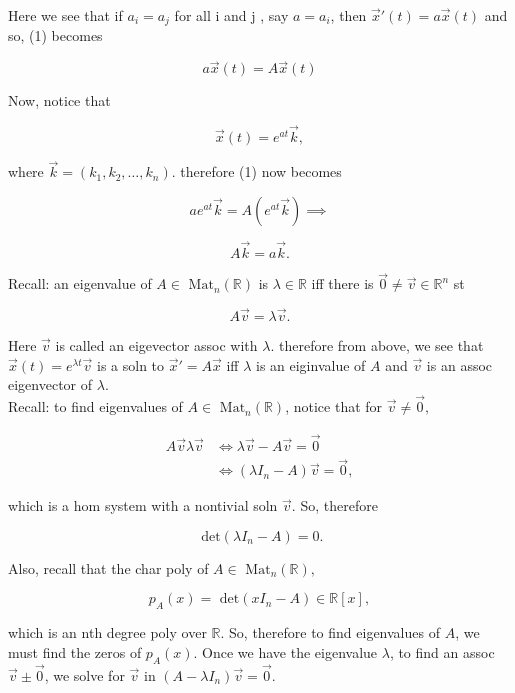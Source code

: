 \documentclass[12pt,a4paper]{article}
\theoremstyle{definition}
\begin{document}
Here we see that if \( a_i = a_j \) for all i and j , say \( a = a_i\), then
\( \vec{x}'(t) = a\vec{x}(t) \) and so, (1) becomes 

\[ a\vec{x}(t) = A\vec{x}(t) \]

Now, notice that 

\[ \vec{x}(t) = e^{at}\vec{k}, \]

where \( \vec{k} = (k_1, k_2, \dots , k_n) \). therefore (1) now becomes

\[ ae^{at}\vec{k} = A(e^{at}\vec{k}) \implies  \]

\[ A\vec{k} = a\vec{k}. \]

Recall: an eigenvalue of \( A \in \text{ Mat}_n( \mathbb{R}) \) is
\( \lambda \in \mathbb{R} \) iff there is \( \vec{0} \neq \vec{v} \in
\mathbb{R}^n\) st 

\[ A\vec{v} = \lambda \vec{v}. \]

Here \( \vec{v} \) is called an eigevector assoc with \( \lambda. \)
therefore from above, we see that \( \vec{x}(t) = e^{\lambda t}\vec{v}
\) is a soln to \( \vec{x}' = A \vec{x} \) iff \( \lambda \) is an
eiginvalue of \( A \) and \( \vec{v} \) is an assoc eigenvector of \(
\lambda. \) \\

Recall: to find eigenvalues of \( A \in \text{ Mat}_n( \mathbb{R}) \),
notice that for \( \vec{v} \neq \vec{0}, \)

\begin{align*}
  A\vec{v} \lambda \vec{v} &\iff \lambda \vec{v} - A \vec{v} = \vec{0}\\
  &\iff (\lambda I_n  - A) \vec{v} = \vec{0}, 
\end{align*}

which is a hom system with a nontivial soln \( \vec{v} \). So, therefore

\[ \text{ det}(\lambda I_n -A) = 0.\]

Also, recall that the char poly of \(  A \in \text{ Mat}_n( \mathbb{R}),  \)

\[ p_A(x) = \text{ det}(xI_n-A) \in \mathbb{R}[x], \]

which is an nth degree poly over \( \mathbb{R} \). So, therefore to find
eigenvalues of \( A \), we must find the zeros of \( p_A(x) \). Once we
have the eigenvalue \( \lambda \), to find an assoc \( \vec{v} \pm
\vec{0} \), we solve for \( \vec{v} \) in \( (A - \lambda I_n) \vec{v} =
\vec{0}\). \\[5mm]

\end{document}

